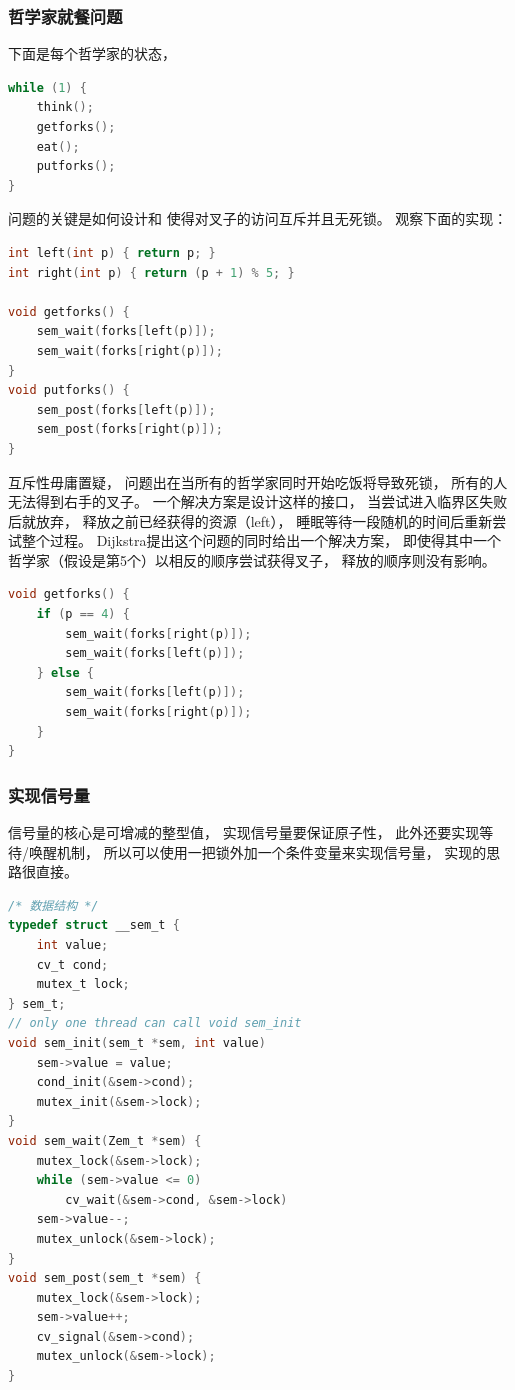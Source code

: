\documentclass[11pt]{article}
\begin{document}
\subsubsection{哲学家就餐问题}
下面是每个哲学家的状态，
\begin{lstlisting}[language=C]
while (1) {
	think();
	getforks();
	eat();
	putforks();
}
\end{lstlisting}
问题的关键是如何设计和
使得对叉子的访问互斥并且无死锁。
观察下面的实现：
\begin{lstlisting}[language=C]
int left(int p) { return p; }
int right(int p) { return (p + 1) % 5; }

void getforks() {
	sem_wait(forks[left(p)]);
	sem_wait(forks[right(p)]);
}
void putforks() {
	sem_post(forks[left(p)]);
	sem_post(forks[right(p)]);
}
\end{lstlisting}
互斥性毋庸置疑，
问题出在当所有的哲学家同时开始吃饭将导致死锁，
所有的人无法得到右手的叉子。
一个解决方案是设计这样的接口，
当尝试进入临界区失败后就放弃，
释放之前已经获得的资源（left），
睡眠等待一段随机的时间后重新尝试整个过程。
Dijkstra提出这个问题的同时给出一个解决方案，
即使得其中一个哲学家（假设是第5个）以相反的顺序尝试获得叉子，
释放的顺序则没有影响。
\begin{lstlisting}[language=C]
void getforks() {
	if (p == 4) {
		sem_wait(forks[right(p)]);
		sem_wait(forks[left(p)]);
	} else {
		sem_wait(forks[left(p)]);
		sem_wait(forks[right(p)]);
	}
}
\end{lstlisting}

\subsubsection{实现信号量}
信号量的核心是可增减的整型值，
实现信号量要保证原子性，
此外还要实现等待/唤醒机制，
所以可以使用一把锁外加一个条件变量来实现信号量，
实现的思路很直接。
\begin{lstlisting}[language=C]
/* 数据结构 */
typedef struct __sem_t {
	int value;
	cv_t cond;
	mutex_t lock;
} sem_t;
// only one thread can call void sem_init
void sem_init(sem_t *sem, int value)
	sem->value = value;
	cond_init(&sem->cond);
	mutex_init(&sem->lock);
}
void sem_wait(Zem_t *sem) {
	mutex_lock(&sem->lock);
	while (sem->value <= 0)
		cv_wait(&sem->cond, &sem->lock)
	sem->value--;
	mutex_unlock(&sem->lock);
}
void sem_post(sem_t *sem) {
	mutex_lock(&sem->lock);
	sem->value++;
	cv_signal(&sem->cond);
	mutex_unlock(&sem->lock);
}
\end{lstlisting}
\end{document}
